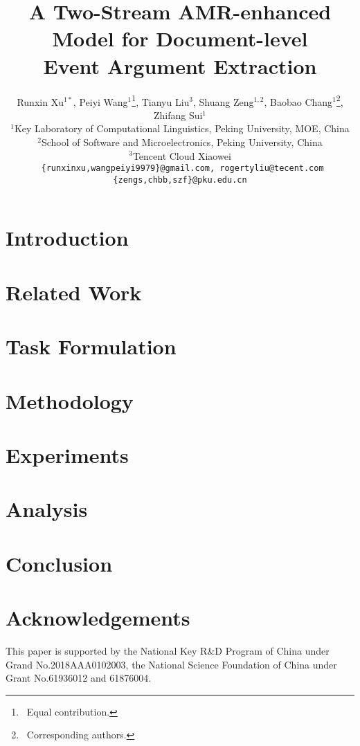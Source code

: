 \documentclass[11pt]{article}
\title{A Two-Stream AMR-enhanced Model for Document-level \\ Event Argument Extraction}
\author{
Runxin Xu$^{1*}$, 
Peiyi Wang$^1$\thanks{\, Equal contribution.},
Tianyu Liu$^3$, Shuang Zeng$^{1,2}$,
Baobao Chang$^{1}$\thanks{\, Corresponding authors.},
Zhifang Sui$^{1}$ \\
$^1$Key Laboratory of Computational Linguistics, Peking University, MOE, China \\
$^2$School of Software and Microelectronics, Peking University, China \\
$^3$Tencent Cloud Xiaowei \\
\texttt{
 \{runxinxu,wangpeiyi9979\}@gmail.com, rogertyliu@tecent.com} \\
\texttt{
\{zengs,chbb,szf\}@pku.edu.cn
}
}
\begin{document}
\maketitle

\newcommand{\modelname}{\textsc{Tsar}\xspace}
\newcommand{\modelnamebase}{\textsc{Tsar}$_{\mathrm{base}}$\xspace}
\newcommand{\modelnamelarge}{\textsc{Tsar}$_{\mathrm{large}}$\xspace}
\newcommand{\vect}[1]{\mathbf{#1}}



\section{Introduction}


\section{Related Work}


\section{Task Formulation}


\section{Methodology}


\section{Experiments}


\section{Analysis}


\section{Conclusion}


\section*{Acknowledgements}
This paper is supported by the National Key R\&D Program of China under Grand No.2018AAA0102003,
the National Science Foundation of China under
Grant No.61936012 and 61876004.




\clearpage
\appendix

\end{document}
